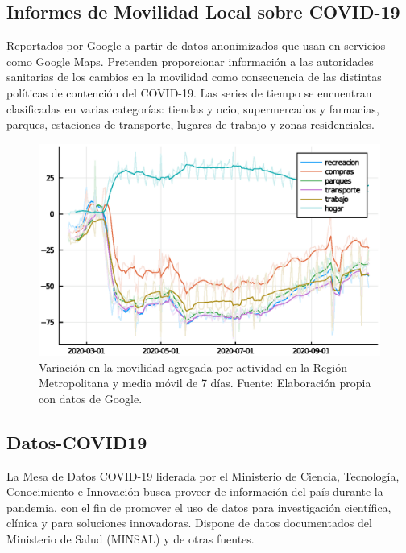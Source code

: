 \subsection{Informes de Movilidad Local sobre COVID-19}

Reportados por Google a partir de datos anonimizados que usan en servicios como Google Maps. Pretenden proporcionar información a las autoridades sanitarias de los cambios en la movilidad como consecuencia de las distintas políticas de contención del COVID-19. Las series de tiempo se encuentran clasificadas en varias categorías: tiendas y ocio, supermercados y farmacias, parques, estaciones de transporte, lugares de trabajo y zonas residenciales.

\begin{figure}[h]
\centering
\includegraphics[width=\textwidth]{img/metodologia/datos/explorar_movilidad_google_6_1.eps}
\caption{Variación en la movilidad agregada por actividad en la Región Metropolitana y media móvil de 7 días. Fuente: Elaboración propia con datos de Google.}
\label{img:google-movilidad-RM}
\end{figure}

\subsection{Datos-COVID19}

La Mesa de Datos COVID-19 liderada por el Ministerio de Ciencia, Tecnología, Conocimiento e Innovación busca proveer de información del país durante la pandemia, con el fin de promover el uso de datos para investigación científica, clínica y para soluciones innovadoras. Dispone de datos documentados del Ministerio de Salud (MINSAL) y de otras fuentes.

